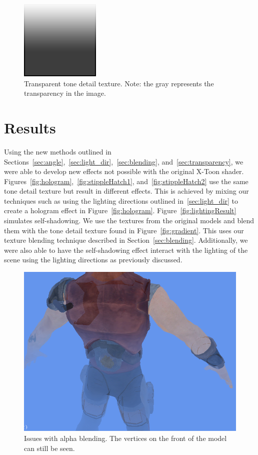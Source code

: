 \documentclass[annual]{acmsiggraph}
\begin{document}
\begin{figure}[h]
	\centering
	\includegraphics[width=1.5in]{images/xtoon_shading_alpha}
	\caption{Transparent tone detail texture. Note: the gray represents the transparency in the image.}
	\label{fig:transparent_tone}
\end{figure}

\section{Results}
\label{sec:results}
Using the new methods outlined in Sections~\ref{sec:angle},~\ref{sec:light_dir},~\ref{sec:blending}, and~\ref{sec:transparency}, we were able to develop new effects not possible with the original X-Toon shader. Figures~\ref{fig:hologram},~\ref{fig:stippleHatch1}, and~\ref{fig:stippleHatch2} use the same tone detail texture but result in different effects. This is achieved by mixing our techniques such as using the lighting directions outlined in~\ref{sec:light_dir} to create a hologram effect in Figure~\ref{fig:hologram}. Figure~\ref{fig:lightingResult} simulates self-shadowing. We use the textures from the original models and blend them with the tone detail texture found in Figure~\ref{fig:gradient}. This uses our texture blending technique described in Section~\ref{sec:blending}. Additionally, we were also able to have the self-shadowing effect interact with the lighting of the scene using the lighting directions as previously discussed.

\begin{figure}[h]
 \centering
 \includegraphics[width=5.5in]{images/alpha_issues}
 \caption{Issues with alpha blending. The vertices on the front of the model can still be seen.}
 \label{fig:alpha_issue}
\end{figure}
\end{document}
